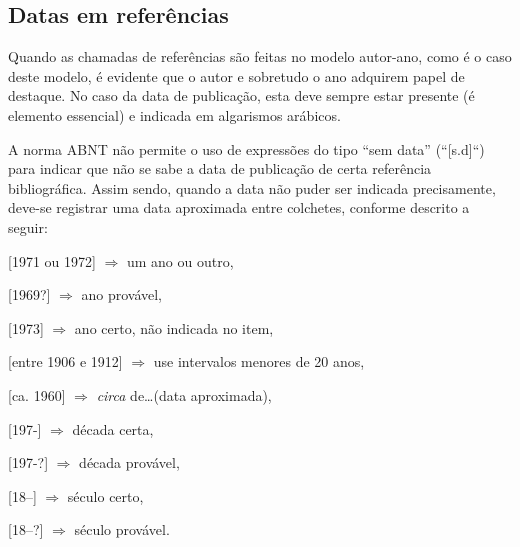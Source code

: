 \begin{apendicesenv}






    \section{Datas em referências}
    \label{sec_datas_em_referencias}

    Quando as chamadas de referências são feitas no modelo autor-ano, como é o caso deste modelo, é evidente que o autor e sobretudo o ano adquirem papel de destaque.
    No caso da data de publicação, esta deve sempre estar presente (é elemento essencial) e indicada em algarismos arábicos.

    A norma ABNT não permite o uso de expressões do tipo ``sem data'' (``[s.d]``) para indicar que não se sabe a data de publicação de certa referência bibliográfica.
    Assim sendo, quando a data não puder ser indicada precisamente, deve-se registrar uma data aproximada entre colchetes, conforme descrito a seguir:

    [1971 ou 1972] $\Longrightarrow$ um ano ou outro,

    [1969?] $\Longrightarrow$ ano provável,

    [1973] $\Longrightarrow$ ano certo, não indicada no item,

    [entre 1906 e 1912] $\Longrightarrow$ use intervalos menores de 20 anos,

    [ca. 1960] $\Longrightarrow$ \textit{circa} de\ldots (data aproximada),

    [197-] $\Longrightarrow$ década certa,

    [197-?] $\Longrightarrow$ década provável,

    [18--] $\Longrightarrow$ século certo,

    [18--?] $\Longrightarrow$ século provável.

\end{apendicesenv}
